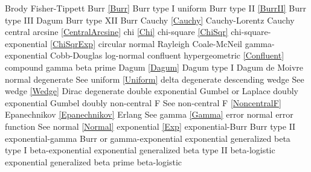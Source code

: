 Brody						\dotfill	Fisher-Tippett						\ncite	%
Burr							\dotfill	\eqref{Burr} 						\ncite	%
Burr	type I					\dotfill	uniform 							\ncite	%
Burr type II					\dotfill	\eqref{BurrII} 						\ncite	%
Burr type III					\dotfill	Dagum							\ncite	%
Burr type XII					\dotfill	Burr 								\ncite	%
%
Cauchy	 					\dotfill	\eqref{Cauchy} 							%
Cauchy-Lorentz 				\dotfill	Cauchy 							\ncite	%
central arcsine 					\dotfill	\eqref{CentralArcsine} 				\ncite	%
chi							\dotfill	\eqref{Chi}						\ncite	%
chi-square						\dotfill	\eqref{ChiSqr}						\ncite	%
chi-square-exponential			\dotfill	\eqref{ChiSqrExp}					\mcite{\self}	%
circular normal					\dotfill	Rayleigh							\ncite %
Coale-McNeil 					\dotfill	gamma-exponential 					     %
Cobb-Douglas					\dotfill	log-normal 						\ncite	%
confluent hypergeometric 			\dotfill	\eqref{Confluent}					\ncite
compound gamma				\dotfill	beta prime							%
%
Dagum 						\dotfill	\eqref{Dagum} 						\ncite	%
Dagum type I 					\dotfill	Dagum							\ncite	%
de Moivre						\dotfill	normal 							\ncite	%
degenerate					\dotfill	See uniform \eqref{Uniform} 			\ncite	%
delta  						\dotfill	degenerate  						\ncite 	%
descending wedge				\dotfill	See wedge \eqref{Wedge} 			\ncite	%
Dirac							\dotfill	degenerate						\ncite	
double exponential 				\dotfill	Gumbel or Laplace 					\ncite	%
doubly exponential				\dotfill	Gumbel							\ncite	%
doubly non-central F       			 \dotfill	See non-central F  \eqref{NoncentralF} 	\ncite 
%
Epanechnikov					\dotfill	\eqref{Epanechnikov}				\ncite
Erlang						\dotfill	See gamma \eqref{Gamma} 			\ncite 	%
error 						\dotfill	normal 							\ncite	%
error function					\dotfill	See normal \eqref{Normal}			\ncite	%
exponential 					\dotfill	\eqref{Exp} 						\ncite	%
exponential-Burr				\dotfill	Burr type II 						\ncite	%
exponential-gamma				\dotfill	Burr 	or gamma-exponential			  		%
exponential generalized beta type I 	\dotfill	beta-exponential					 	%
exponential generalized beta type II 	\dotfill	beta-logistic						 	%
exponential generalized beta prime 	\dotfill	beta-logistic						\ncite	%
